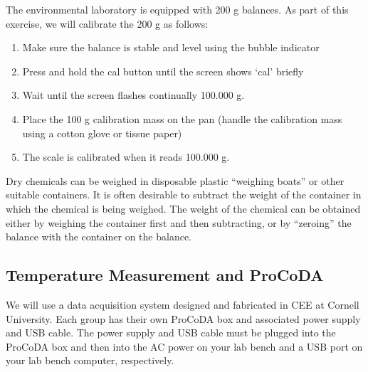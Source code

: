 \documentclass[letterpaper,10pt,english]{sphinxmanual}
\begin{document}
The environmental laboratory is equipped with 200 g balances.  As part of this exercise, we will calibrate the 200 g as follows:
\begin{enumerate}
\item {} 
Make sure the balance is stable and level using the bubble indicator

\item {} 
Press and hold the cal button until the screen shows ‘cal’ briefly

\item {} 
Wait until the screen flashes continually 100.000 g.

\item {} 
Place the 100 g calibration mass on the pan (handle the calibration mass using a cotton glove or tissue paper)

\item {} 
The scale is calibrated when it reads 100.000 g.

\end{enumerate}

Dry chemicals can be weighed in disposable plastic “weighing boats” or other suitable containers. It is often desirable to subtract the weight of the container in which the chemical is being weighed. The weight of the chemical can be obtained either by weighing the container first and then subtracting, or by “zeroing” the balance with the container on the balance.


\subsection{Temperature Measurement and ProCoDA}
\label{\detokenize{Laboratory_Measurements/Laboratory_Measurements:temperature-measurement-and-procoda}}
We will use a data acquisition system designed and fabricated in CEE at Cornell University. Each group has their own ProCoDA box and associated power supply and USB cable. The power supply and USB cable must be plugged into the ProCoDA box and then into the AC power on your lab bench and a USB port on your lab bench computer, respectively.
\end{document}
